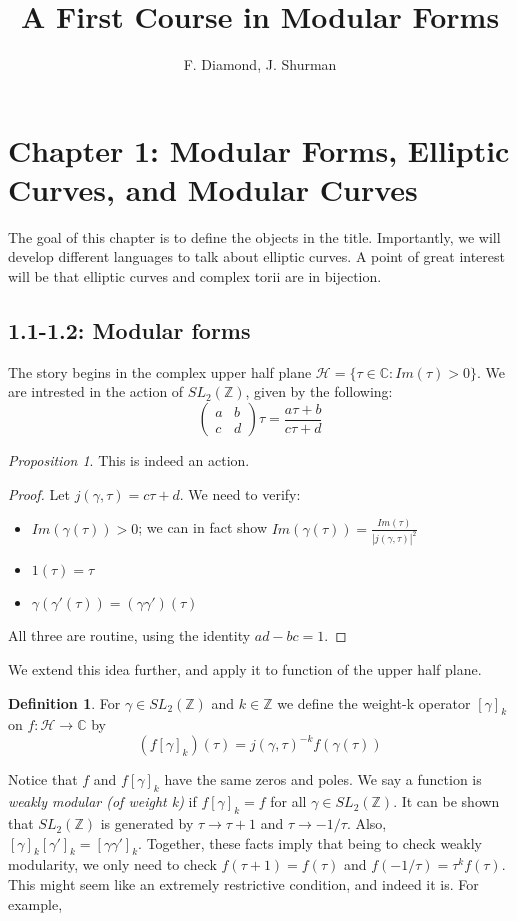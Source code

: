 \documentclass[11pt]{article}
\title{A First Course in Modular Forms}
\author{F. Diamond, J. Shurman}
\date{}
\theoremstyle{plain}
\theoremstyle{definition}
\newtheorem{definition}{Definition}[section]
\theoremstyle{example}
\theoremstyle{remark}
\theoremstyle{lemma}
\theoremstyle{proposition}
\newtheorem{proposition}{Proposition}[section]
\theoremstyle{Problem}
\theoremstyle{Solution}
\theoremstyle{theorem}
\theoremstyle{corollary}
\begin{document}
\maketitle



\section{Chapter 1: Modular Forms, Elliptic Curves, and Modular Curves}
The goal of this chapter is to define the objects in the title. Importantly, we will develop different languages to talk about elliptic curves. A point of great interest will be that elliptic curves and complex torii are in bijection.

\subsection{1.1-1.2: Modular forms}
The story begins in the complex upper half plane $\mathcal{H} = \{\tau\in \mathbb{C} : Im(\tau)>0 \}$. We are intrested in the action of $SL_2(\mathbb{Z})$, given by the following:
$$ \begin{pmatrix}
a & b \\
c & d
\end{pmatrix} \tau = \frac{a\tau+b}{c\tau+d}$$
\begin{proposition}
This is indeed an action.
\end{proposition}
\begin{proof}
Let $j(\gamma, \tau) = c\tau + d$. We need to verify:
\begin{itemize}
\item $Im(\gamma(\tau)) > 0$; we can in fact show $Im(\gamma(\tau)) = \frac{Im(\tau)}{|j(\gamma,\tau)|^2}$
\item $1(\tau) = \tau$
\item $\gamma(\gamma'(\tau)) = (\gamma\gamma')(\tau)$
\end{itemize}
All three are routine, using the identity $ad-bc = 1$.
\end{proof}
We extend this idea further, and apply it to function of the upper half plane.
\begin{definition}
For $\gamma \in SL_2(\mathbb{Z})$ and $k\in \mathbb{Z}$ we define the weight-k operator $[\gamma]_k$ on $f: \mathcal{H} \to \mathbb{C}$ by 
$$ (f[\gamma]_k) ( \tau) = j(\gamma, \tau)^{-k} f(\gamma(\tau))$$
\end{definition}
Notice that $f$ and $f[\gamma]_k$ have the same zeros and poles. We say a function is \textit{weakly modular (of weight k)} if $f[\gamma]_k = f$ for all $\gamma \in SL_2(\mathbb{Z})$. It can be shown that $SL_2(\mathbb{Z})$ is generated by $\tau \to \tau+1$ and $\tau \to -1/\tau$. Also, $[\gamma]_k[\gamma']_k = [\gamma\gamma']_k$. Together, these facts imply that being to check weakly modularity, we only need to check $f(\tau+1) = f(\tau)$ and $f(-1/\tau) = \tau^k f(\tau)$. This might seem like an extremely restrictive condition, and indeed it is. For example,
\end{document}
